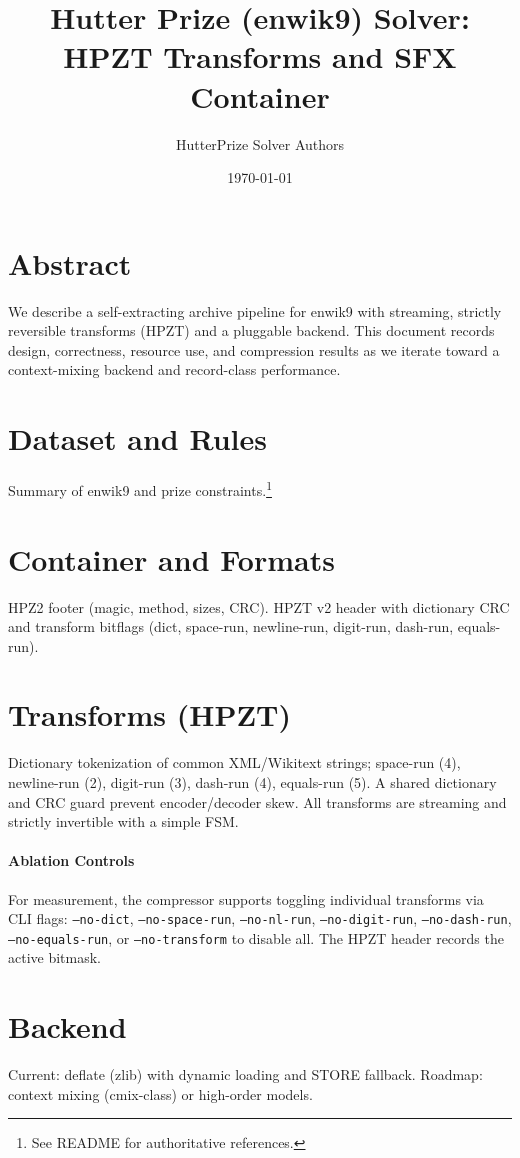 \documentclass[11pt]{article}
\title{Hutter Prize (enwik9) Solver: HPZT Transforms and SFX Container}\author{HutterPrize Solver Authors}\date{\today}
\begin{document}
\maketitle
\section*{Abstract}
We describe a self-extracting archive pipeline for enwik9 with streaming, strictly reversible transforms (HPZT) and a pluggable backend. This document records design, correctness, resource use, and compression results as we iterate toward a context-mixing backend and record-class performance.
\section{Dataset and Rules}
Summary of enwik9 and prize constraints.\footnote{See README for authoritative references.}
\section{Container and Formats}
HPZ2 footer (magic, method, sizes, CRC). HPZT v2 header with dictionary CRC and transform bitflags (dict, space-run, newline-run, digit-run, dash-run, equals-run).
\section{Transforms (HPZT)}
Dictionary tokenization of common XML/Wikitext strings; space-run (\texttt{\ge}4), newline-run (\texttt{\ge}2), digit-run (\texttt{\ge}3), dash-run (\texttt{\ge}4), equals-run (\texttt{\ge}5). A shared dictionary and CRC guard prevent encoder/decoder skew. All transforms are streaming and strictly invertible with a simple FSM.
\paragraph{Ablation Controls} For measurement, the compressor supports toggling individual transforms via CLI flags: \texttt{--no-dict}, \texttt{--no-space-run}, \texttt{--no-nl-run}, \texttt{--no-digit-run}, \texttt{--no-dash-run}, \texttt{--no-equals-run}, or \texttt{--no-transform} to disable all. The HPZT header records the active bitmask.
\section{Backend}
Current: deflate (zlib) with dynamic loading and STORE fallback. Roadmap: context mixing (cmix-class) or high-order models.
\end{document}
